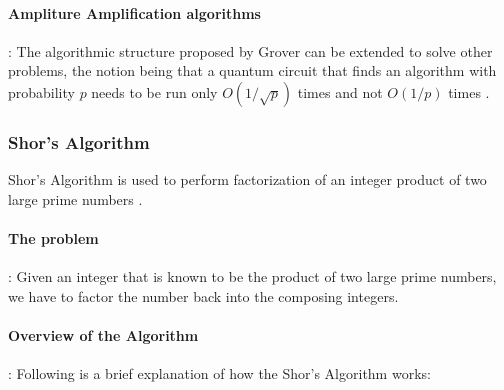 \paragraph*{Ampliture Amplification algorithms}: The algorithmic structure proposed by Grover can be extended to solve other problems, the notion being that a quantum circuit that finds an algorithm with probability $p$ needs to be run only $O(1/\sqrt{p})$ times and not $O(1/p)$ times \cite{quantum-amplitude-amplification-algorithms}.

\subsubsection{Shor's Algorithm}

Shor's Algorithm is used to perform factorization of an integer product of two large prime numbers \cite{shor-quantum-algorithm-explaination}.

\paragraph*{The problem}: Given an integer that is known to be the product of two large prime numbers, we have to factor the number back into the composing integers.

\paragraph*{Overview of the Algorithm}: Following is a brief explanation of how the Shor's Algorithm works:

